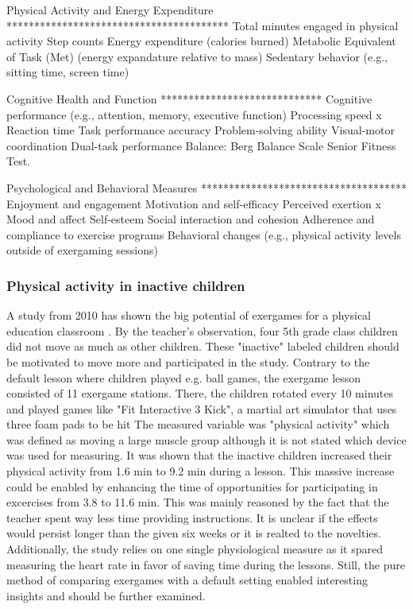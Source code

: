 Physical Activity and Energy Expenditure
****************************************
Total minutes engaged in physical activity
Step counts
Energy expenditure (calories burned)
Metabolic Equivalent of Task (Met) (energy expandature relative to mass)
Sedentary behavior (e.g., sitting time, screen time)

Cognitive Health and Function
*****************************
Cognitive performance (e.g., attention, memory, executive function)
Processing speed
x Reaction time
Task performance accuracy
Problem-solving ability
Visual-motor coordination
Dual-task performance
Balance:					Berg Balance Scale
                            Senior Fitness Test.

Psychological and Behavioral Measures
*************************************
Enjoyment and engagement
Motivation and self-efficacy
Perceived exertion
x Mood and affect
Self-esteem
Social interaction and cohesion
Adherence and compliance to exercise programs
Behavioral changes (e.g., physical activity levels outside of exergaming sessions)


\subsubsection{Physical activity in inactive children}
A study from 2010 has shown the big potential of exergames for a physical education classroom \cite{fogel2010effects}. By the teacher's observation, four 5th grade class children did not move as much as other children. These "inactive" labeled children should be motivated to move more and participated in the study. 
Contrary to the default lesson where children played e.g. ball games, the exergame lesson consisted of 11 exergame stations. There, the children rotated every 10 minutes and played games like "Fit Interactive 3 Kick", a martial art simulator that uses three foam pads to be hit 
The measured variable was "physical activity" which was defined as moving a large muscle group although it is not stated which device was used for measuring. It was shown that the inactive children increased their physical activity from 1.6 min to 9.2 min during a lesson. This massive increase could be enabled by enhancing the time of opportunities for participating in excercises from 3.8 to 11.6 min. This was mainly reasoned by the fact that the teacher spent way less time providing instructions. 
It is unclear if the effects would persist longer than the given six weeks or it is realted to the novelties. Additionally, the study relies on one single physiological measure as it spared measuring the heart rate in favor of saving time during the lessons. Still, the pure method of comparing exergames with a default setting enabled interesting insights and should be further examined.

